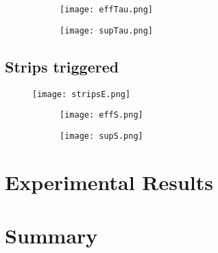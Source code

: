 \begin{figure}[ht]
		\centering
		\hspace*{\fill}
		\begin{subfigure}[b]{0.48\textwidth}
			\centering
			\texttt{[image: effTau.png]}
			\caption{}\label{}
		\end{subfigure}
		\hfill
		\begin{subfigure}[b]{0.48\textwidth}
			\centering
			\texttt{[image: supTau.png]}
			\caption{}\label{}
		\end{subfigure}
		\hspace*{\fill}
		\caption{}\label{}
\end{figure}





\subsection{Strips triggered}




\begin{figure}[ht]
	\hspace*{\fill}
	\centering
	\texttt{[image: stripsE.png]}
	\hspace*{\fill}
	\caption{}\label{}
\end{figure}


\begin{figure}[ht]
		\centering
		\hspace*{\fill}
		\begin{subfigure}[b]{0.48\textwidth}
			\centering
			\texttt{[image: effS.png]}
			\caption{}\label{}
		\end{subfigure}
		\hfill
		\begin{subfigure}[b]{0.48\textwidth}
			\centering
			\texttt{[image: supS.png]}
			\caption{}\label{}
		\end{subfigure}
		\hspace*{\fill}
		\caption{}\label{}
\end{figure}




\section{Experimental Results}

\section{Summary}


